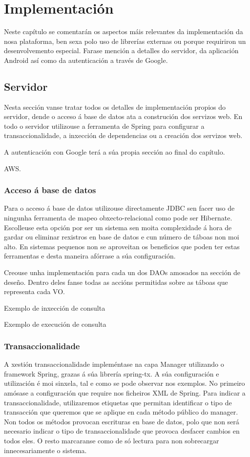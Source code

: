 \chapter{Implementación}

Neste capítulo se comentarán os aspectos máis relevantes da implementación da nosa plataforma, ben sexa polo uso de librerías externas ou porque requiriron un desenvolvemento especial. Farase mención a detalles do servidor, da aplicación Android así como da autenticación a través de Google.


\section{Servidor}
Nesta sección vanse tratar todos os detalles de implementación propios do servidor, dende o acceso á base de datos ata a construción dos servizos web. En todo o servidor utilizouse a ferramenta de Spring para configurar a transaccionalidade, a inxección de dependencias ou a creación dos servizos web.

A autenticación con Google terá a súa propia sección ao final do capítulo.


AWS.

\subsection{Acceso á base de datos}
Para o acceso á base de datos utilizouse directamente JDBC sen facer uso de ningunha ferramenta de mapeo obxecto-relacional como pode ser Hibernate. Escolleuse esta opción por ser un sistema sen moita complexidade á hora de gardar ou eliminar rexistros en base de datos e cun número de táboas non moi alto. En sistemas pequenos non se aproveitan os beneficios que poden ter estas ferramentas e desta maneira afórrase a súa configuración.

Creouse unha implementación para cada un dos DAOs amosados na sección de deseño. Dentro deles fanse todas as accións permitidas sobre as táboas que representa cada VO.

Exemplo de inxección de consulta

Exemplo de execución de consulta








\subsection{Transaccionalidade}
A xestión transaccionalidade impleméntase na capa Manager utilizando o framework Spring, grazas á súa librería spring-tx. A súa configuración e utilización é moi sinxela, tal e como se pode observar nos exemplos. No primeiro amósase a configuración que require nos ficheiros XML de Spring. Para indicar a transaccionalidade, utilizaremos etiquetas que permitan identificar o tipo de transacción que queremos que se aplique en cada método público do manager. Non todos os métodos provocan escrituras en base de datos, polo que non será necesario indicar o tipo de transaccionalidade que provoca desfacer cambios en todos eles. O resto marcaranse como de só lectura para non sobrecargar innecesariamente o sistema.

